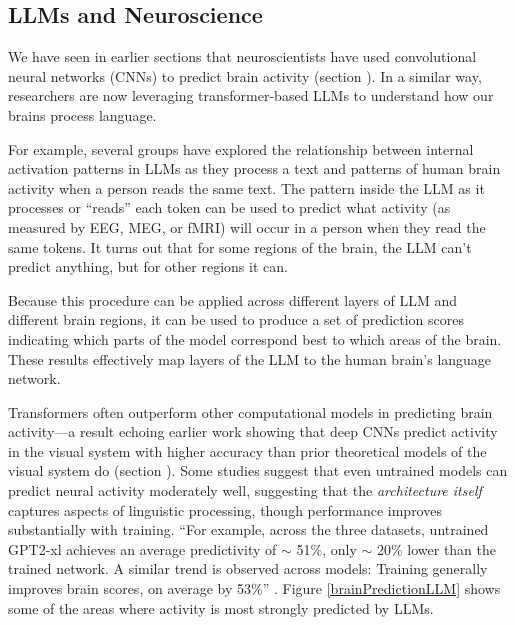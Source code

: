 \subsection{LLMs and Neuroscience}

We have seen in earlier sections that neuroscientists have used convolutional
neural networks (CNNs) to predict brain activity (section
). In a similar way, researchers are now leveraging
transformer-based LLMs to understand how our brains process language. 

For example, several groups \cite{pasquiou2022neural, schrimpf2021neural,
caucheteux2022brains} have explored the relationship between internal
activation patterns in LLMs as they process a text and patterns of human brain
activity when a person reads the same text. The pattern inside the LLM as it processes or ``reads'' each token can be used to predict what activity (as measured by EEG, MEG, or fMRI) will occur in a person when they read the same tokens. It turns out that for some regions of the brain, the LLM can't predict anything, but for other regions it can. 

Because this procedure can be applied across different layers of LLM and
different brain regions, it can be used to produce  a set of prediction scores
indicating which parts of the model correspond best to which areas of the
brain. These results effectively map layers of the LLM to the human brain's language
network.

Transformers often outperform other computational models in predicting brain
activity---a result echoing earlier work showing that deep CNNs predict
activity in the visual system with higher accuracy than prior theoretical
models of the visual system do (section ). Some
studies suggest that even untrained models can predict neural activity
moderately well, suggesting that the \emph{architecture itself} captures
aspects of linguistic processing, though performance improves substantially
with training. ``For example, across the three datasets, untrained GPT2-xl
achieves an average predictivity of $\sim$ 51\%, only $\sim$ 20\% lower than
the trained network. A similar trend is observed across models: Training
generally improves brain scores, on average by 53\%''
\cite{schrimpf2021neural}. Figure \ref{brainPredictionLLM} shows some of the
areas where activity is most strongly predicted by LLMs.

